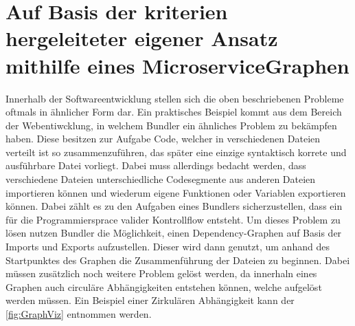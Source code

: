 \documentclass[
	12pt,
	BCOR=5mm,
	DIV=12,
	headinclude=on,
	footinclude=off,
	parskip=half,
	bibliography=totoc,
	listof=entryprefix,
	toc=listof,
	numbers=noenddot,
	plainfootsepline
]{scrreprt}
\begin{document}
\section{Auf Basis der kriterien hergeleiteter eigener Ansatz mithilfe eines MicroserviceGraphen}

Innerhalb der Softwareentwicklung stellen sich die oben beschriebenen Probleme oftmals in ähnlicher Form dar. Ein praktisches Beispiel kommt aus dem Bereich der Webentiwcklung, in welchem Bundler ein ähnliches Problem zu bekämpfen haben. Diese besitzen zur Aufgabe Code, welcher in verschiedenen Dateien verteilt ist so zusammenzuführen, das später eine einzige syntaktisch korrete und ausführbare Datei vorliegt. Dabei muss allerdings bedacht werden, dass verschiedene Dateien unterschiedliche Codesegmente aus anderen Dateien importieren können und wiederum eigene Funktionen oder Variablen exportieren können. Dabei zählt es zu den Aufgaben eines Bundlers sicherzustellen, dass ein für die Programmiersprace valider Kontrollflow entsteht. Um dieses Problem zu lösen nutzen Bundler die Möglichkeit, einen Dependency-Graphen auf Basis der Imports und Exports aufzustellen. Dieser wird dann genutzt, um anhand des Startpunktes des Graphen die Zusammenführung der Dateien zu beginnen. Dabei müssen zusätzlich noch weitere Problem gelöst werden, da innerhaln eines Graphen auch circuläre Abhängigkeiten entstehen können, welche aufgelöst werden müssen. Ein Beispiel einer Zirkulären Abhängigkeit kann der \autoref{fig:GraphViz} entnommen werden.
\end{document}
